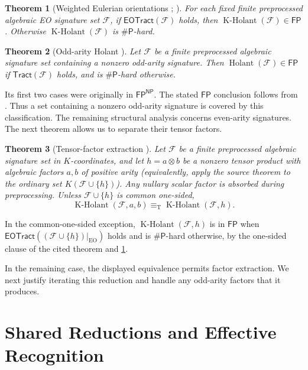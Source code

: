 \documentclass[11pt,letterpaper,onecolumn]{article}
\theoremstyle{plain}
\newtheorem{theorem}{Theorem}[section]
\theoremstyle{definition}
\theoremstyle{remark}
\newcommand{\cF}{\mathcal F}
\newcommand{\Holant}{\operatorname{Holant}}
\newcommand{\KHolant}{\operatorname{K\text{-}Holant}}
\newcommand{\EOTract}{\mathsf{EOTract}}
\newcommand{\Tract}{\mathsf{Tract}}
\newcommand{\FP}{\mathsf{FP}}
\newcommand{\SharpP}{\#\mathsf P}
\newcommand{\EO}{\mathrm{EO}}
\newcommand{\equivT}{\equiv_{\mathrm T}}
\begin{document}
\begin{theorem}[Weighted Eulerian orientations
{\cite[Theorem~26]{MengWangXia2025EO}; \cite[Theorem~1.1]{GuanShaoShi2026}}]
\label{thm:external-eo}
For each fixed finite preprocessed algebraic EO signature set \(\cF\), if \(\EOTract(\cF)\) holds,
then \(\KHolant(\cF)\in\FP\). Otherwise
\(\KHolant(\cF)\) is \(\SharpP\)-hard.
\end{theorem}

\begin{theorem}[Odd-arity Holant
{\cite[full version, Theorem~33; conference version, Theorem~30]{MengWangXiaZheng2025}}]
\label{thm:external-odd}
Let \(\cF\) be a finite preprocessed algebraic signature set containing a
nonzero odd-arity signature.  Then \(\Holant(\cF)\in\FP\) if
\(\Tract(\cF)\) holds, and is \(\SharpP\)-hard otherwise.
\end{theorem}

Its first two cases were originally in \(\FP^{\mathsf{NP}}\). The
stated \(\FP\) conclusion follows from
\cite[Theorem~1.1 and Corollary~1.2]{GuanShaoShi2026}.
Thus a set containing a nonzero odd-arity signature is covered by this
classification. The remaining structural analysis concerns even-arity
signatures. The next theorem allows us to separate their tensor factors.

\begin{theorem}[Tensor-factor extraction
{\cite[full version, Theorem~32 and Remark~39; conference version,
Theorem~29]{MengWangXiaZheng2025}}]
\label{thm:external-factor}
Let \(\cF\) be a finite preprocessed algebraic signature set in \(K\)-coordinates, and let \(h=a\otimes b\) be a nonzero tensor product with
algebraic factors \(a,b\) of positive arity (equivalently, apply the source theorem
to the ordinary set \(K(\cF\cup\{h\})\)).  Any nullary scalar factor is
absorbed during preprocessing.  Unless
\(\cF\cup\{h\}\) is common one-sided,
\[
  \KHolant(\cF,a,b)\equivT\KHolant(\cF,h).
\]
\end{theorem}

In the common-one-sided exception, \(\KHolant(\cF,h)\) is in \(\FP\)
when \(\EOTract((\cF\cup\{h\})|_{\EO})\) holds and is
\(\SharpP\)-hard otherwise, by the one-sided clause of the cited theorem
and \cref{thm:external-eo}.

In the remaining case, the displayed equivalence permits factor extraction.
We next justify
iterating this reduction and handle any odd-arity factors that it produces.

\section{Shared Reductions and Effective Recognition}
\label{sec:p1-shared-terminals}
\end{document}
